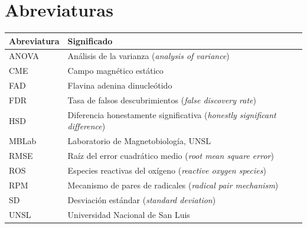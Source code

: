 \vspace{0.4em}

\section*{Abreviaturas}

\begin{longtable}{@{}p{}p{}@{}}
\toprule
Abreviatura & Significado \\
\midrule
\endhead
ANOVA   & Análisis de la varianza (\textit{analysis of variance}) \\
CME     & Campo magnético estático \\
FAD     & Flavina adenina dinucleótido \\
FDR     & Tasa de falsos descubrimientos (\textit{false discovery rate}) \\
HSD     & Diferencia honestamente significativa (\textit{honestly significant difference}) \\
MBLab   & Laboratorio de Magnetobiología, UNSL \\
RMSE    & Raíz del error cuadrático medio (\textit{root mean square error}) \\
ROS     & Especies reactivas del oxígeno (\textit{reactive oxygen species}) \\
RPM     & Mecanismo de pares de radicales (\textit{radical pair mechanism}) \\
SD      & Desviación estándar (\textit{standard deviation}) \\
UNSL    & Universidad Nacional de San Luis \\
\bottomrule
\end{longtable}
\renewcommand{\arraystretch}{1}
\normalsize

\endinput
